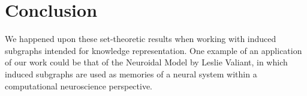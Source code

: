 \documentclass[10pt]{extarticle}
\newtheorem{theorem}{Theorem}
\theoremstyle{definition}
\begin{document}
\section{Conclusion}

We happened upon these set-theoretic results when working with induced subgraphs intended for knowledge representation. One example of an application of our work could be that of the Neuroidal Model by Leslie Valiant, in which induced subgraphs are used as memories of a neural system within a computational neuroscience perspective.


\end{document}
